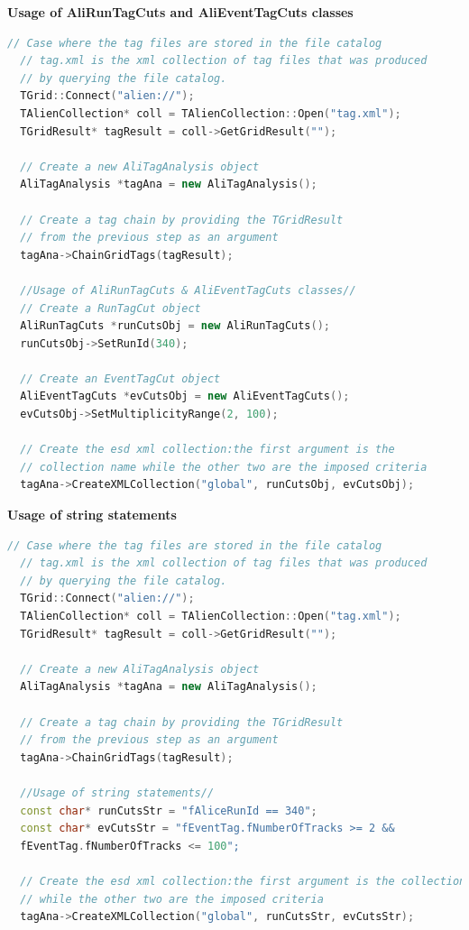 \vspace{0.5 cm}
\textbf{Usage of AliRunTagCuts and AliEventTagCuts classes}
\begin{lstlisting}[language=C++]
  // Case where the tag files are stored in the file catalog
  // tag.xml is the xml collection of tag files that was produced 
  // by querying the file catalog.
  TGrid::Connect("alien://"); 
  TAlienCollection* coll = TAlienCollection::Open("tag.xml");
  TGridResult* tagResult = coll->GetGridResult("");
  
  // Create a new AliTagAnalysis object
  AliTagAnalysis *tagAna = new AliTagAnalysis(); 

  // Create a tag chain by providing the TGridResult
  // from the previous step as an argument
  tagAna->ChainGridTags(tagResult);

  //Usage of AliRunTagCuts & AliEventTagCuts classes//
  // Create a RunTagCut object
  AliRunTagCuts *runCutsObj = new AliRunTagCuts();
  runCutsObj->SetRunId(340);

  // Create an EventTagCut object
  AliEventTagCuts *evCutsObj = new AliEventTagCuts();
  evCutsObj->SetMultiplicityRange(2, 100);

  // Create the esd xml collection:the first argument is the 
  // collection name while the other two are the imposed criteria
  tagAna->CreateXMLCollection("global", runCutsObj, evCutsObj);
\end{lstlisting}


\vspace{0.5 cm}
\textbf{Usage of string statements}
\begin{lstlisting}[language=C++]
  // Case where the tag files are stored in the file catalog
  // tag.xml is the xml collection of tag files that was produced 
  // by querying the file catalog.
  TGrid::Connect("alien://"); 
  TAlienCollection* coll = TAlienCollection::Open("tag.xml");
  TGridResult* tagResult = coll->GetGridResult("");
  
  // Create a new AliTagAnalysis object
  AliTagAnalysis *tagAna = new AliTagAnalysis(); 

  // Create a tag chain by providing the TGridResult
  // from the previous step as an argument
  tagAna->ChainGridTags(tagResult);

  //Usage of string statements//
  const char* runCutsStr = "fAliceRunId == 340";
  const char* evCutsStr = "fEventTag.fNumberOfTracks >= 2 &&
  fEventTag.fNumberOfTracks <= 100";

  // Create the esd xml collection:the first argument is the collection name 
  // while the other two are the imposed criteria 
  tagAna->CreateXMLCollection("global", runCutsStr, evCutsStr);
\end{lstlisting}


